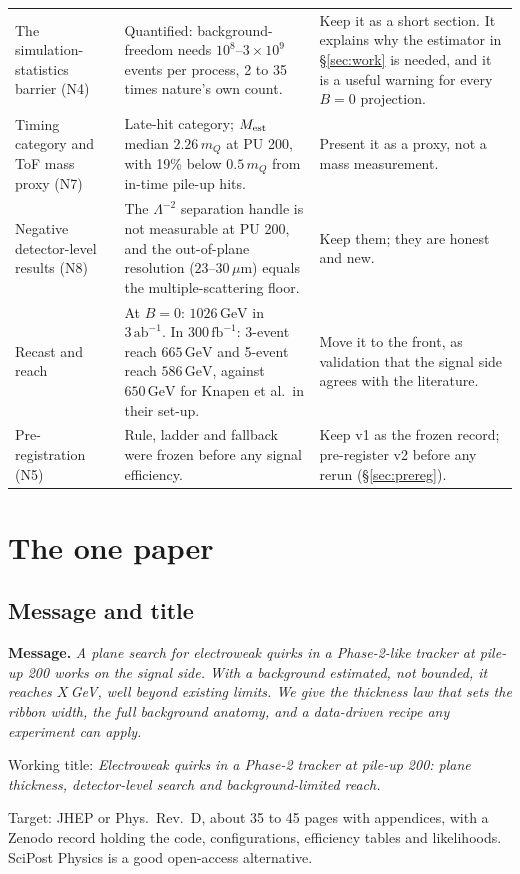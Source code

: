 \documentclass[11pt,a4paper]{article}
\newcommand{\GeV}{\,\mathrm{GeV}}
\newcommand{\abinv}{\,\mathrm{ab}^{-1}}
\newcommand{\fbinv}{\,\mathrm{fb}^{-1}}
\begin{document}
\begin{longtable}{@{}P{34mm}P{61mm}P{59mm}@{}}
The simulation-statistics barrier (N4) &
Quantified: background-freedom needs $10^8$--$3\times10^9$ events per process, 2 to 35 times nature's own count. &
Keep it as a short section. It explains why the estimator in \S\ref{sec:work} is needed, and it is a useful warning for
every $B=0$ projection.\\
Timing category and ToF mass proxy (N7) &
Late-hit category; $M_{\rm est}$ median $2.26\,m_Q$ at PU 200, with 19\% below $0.5\,m_Q$ from in-time pile-up hits. &
Present it as a proxy, not a mass measurement.\\
Negative detector-level results (N8) &
The $\Lambda^{-2}$ separation handle is not measurable at PU 200, and the out-of-plane resolution ($23$--$30\,\mu$m)
equals the multiple-scattering floor. &
Keep them; they are honest and new.\\
Recast and reach &
At $B=0$: $1026\GeV$ in $3\abinv$. In $300\fbinv$: 3-event reach $665\GeV$ and 5-event reach $586\GeV$, against
$650\GeV$ for Knapen et al.\ in their set-up. &
Move it to the front, as validation that the signal side agrees with the literature.\\
Pre-registration (N5) &
Rule, ladder and fallback were frozen before any signal efficiency. &
Keep v1 as the frozen record; pre-register v2 before any rerun (\S\ref{sec:prereg}).\\
\bottomrule
\end{longtable}

\section{The one paper}\label{sec:paper}

\subsection{Message and title}
\textbf{Message.} \emph{A plane search for electroweak quirks in a Phase-2-like tracker at pile-up 200 works on the
signal side. With a background estimated, not bounded, it reaches $X$\,GeV, well beyond existing limits. We give the
thickness law that sets the ribbon width, the full background anatomy, and a data-driven recipe any experiment can apply.}

Working title: \emph{Electroweak quirks in a Phase-2 tracker at pile-up 200: plane thickness, detector-level search and
background-limited reach.}

Target: JHEP or Phys.\ Rev.\ D, about 35 to 45 pages with appendices, with a Zenodo record holding the code, configurations,
efficiency tables and likelihoods. SciPost Physics is a good open-access alternative.
\end{document}
